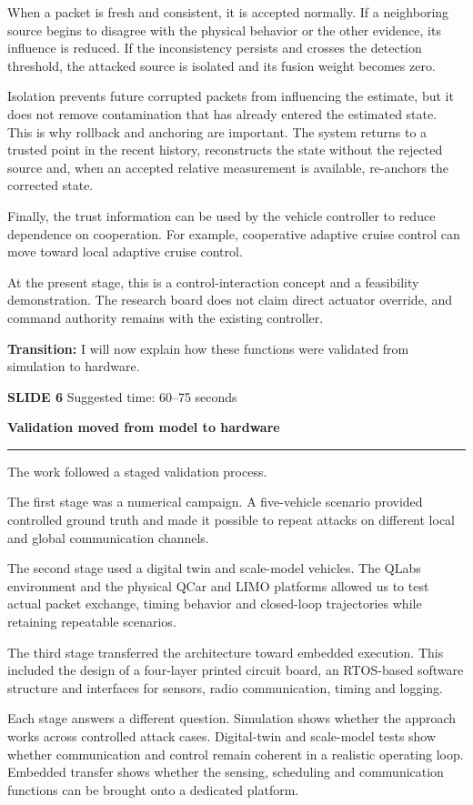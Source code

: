 \documentclass[11pt,a4paper]{article}
\newcommand{\slidetitle}[3]{%
  \clearpage
  {\color{Accent}\large\bfseries SLIDE #1}\hfill
  {\color{Muted}\small Suggested time: #3}\par
  \vspace{0.18cm}
  {\LARGE\bfseries #2}\par
  \vspace{0.20cm}
  {\color{Muted}\rule{\textwidth}{0.5pt}}\par
  \vspace{0.12cm}
}
\newcommand{\transition}[1]{%
  \vfill
  \colorbox{Panel}{%
    \parbox{\dimexpr\textwidth-2\fboxsep\relax}{%
      \raggedright\textbf{Transition:} #1}}
}
\begin{document}
When a packet is fresh and consistent, it is accepted normally. If a neighboring source begins to disagree with the physical behavior or the other evidence, its influence is reduced. If the inconsistency persists and crosses the detection threshold, the attacked source is isolated and its fusion weight becomes zero.

Isolation prevents future corrupted packets from influencing the estimate, but it does not remove contamination that has already entered the estimated state. This is why rollback and anchoring are important. The system returns to a trusted point in the recent history, reconstructs the state without the rejected source and, when an accepted relative measurement is available, re-anchors the corrected state.

Finally, the trust information can be used by the vehicle controller to reduce dependence on cooperation. For example, cooperative adaptive cruise control can move toward local adaptive cruise control.

At the present stage, this is a control-interaction concept and a feasibility demonstration. The research board does not claim direct actuator override, and command authority remains with the existing controller.

\transition{I will now explain how these functions were validated from simulation to hardware.}

\slidetitle{6}{Validation moved from model to hardware}{60--75 seconds}

The work followed a staged validation process.

The first stage was a numerical campaign. A five-vehicle scenario provided controlled ground truth and made it possible to repeat attacks on different local and global communication channels.

The second stage used a digital twin and scale-model vehicles. The QLabs environment and the physical QCar and LIMO platforms allowed us to test actual packet exchange, timing behavior and closed-loop trajectories while retaining repeatable scenarios.

The third stage transferred the architecture toward embedded execution. This included the design of a four-layer printed circuit board, an RTOS-based software structure and interfaces for sensors, radio communication, timing and logging.

Each stage answers a different question. Simulation shows whether the approach works across controlled attack cases. Digital-twin and scale-model tests show whether communication and control remain coherent in a realistic operating loop. Embedded transfer shows whether the sensing, scheduling and communication functions can be brought onto a dedicated platform.
\end{document}
